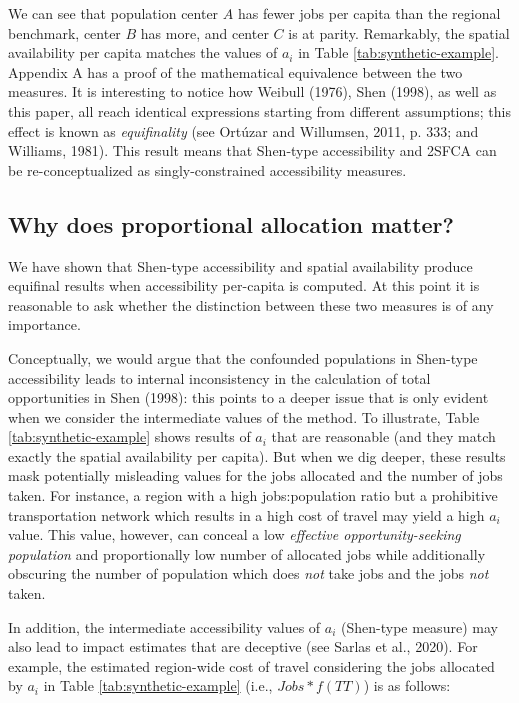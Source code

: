 \documentclass[]{elsarticle} %
\begin{document}
We can see that population center \(A\) has fewer jobs per capita than
the regional benchmark, center \(B\) has more, and center \(C\) is at
parity. Remarkably, the spatial availability per capita matches the
values of \(a_i\) in Table \ref{tab:synthetic-example}. Appendix A has a
proof of the mathematical equivalence between the two measures. It is
interesting to notice how Weibull (1976), Shen (1998), as well as this
paper, all reach identical expressions starting from different
assumptions; this effect is known as \emph{equifinality} (see Ortúzar
and Willumsen, 2011, p. 333; and Williams, 1981). This result means that
Shen-type accessibility and 2SFCA can be re-conceptualized as
singly-constrained accessibility measures.

\hypertarget{why-does-proportional-allocation-matter}{%
\subsection{Why does proportional allocation
matter?}\label{why-does-proportional-allocation-matter}}

We have shown that Shen-type accessibility and spatial availability
produce equifinal results when accessibility per-capita is computed. At
this point it is reasonable to ask whether the distinction between these
two measures is of any importance.

Conceptually, we would argue that the confounded populations in
Shen-type accessibility leads to internal inconsistency in the
calculation of total opportunities in Shen (1998): this points to a
deeper issue that is only evident when we consider the intermediate
values of the method. To illustrate, Table \ref{tab:synthetic-example}
shows results of \(a_i\) that are reasonable (and they match exactly the
spatial availability per capita). But when we dig deeper, these results
mask potentially misleading values for the jobs allocated and the number
of jobs taken. For instance, a region with a high jobs:population ratio
but a prohibitive transportation network which results in a high cost of
travel may yield a high \(a_i\) value. This value, however, can conceal
a low \emph{effective opportunity-seeking population} and proportionally
low number of allocated jobs while additionally obscuring the number of
population which does \emph{not} take jobs and the jobs \emph{not}
taken.

In addition, the intermediate accessibility values of \(a_i\) (Shen-type
measure) may also lead to impact estimates that are deceptive (see
Sarlas et al., 2020). For example, the estimated region-wide cost of
travel considering the jobs allocated by \(a_i\) in Table
\ref{tab:synthetic-example} (i.e., \(Jobs*f(TT)\)) is as follows:
\end{document}
